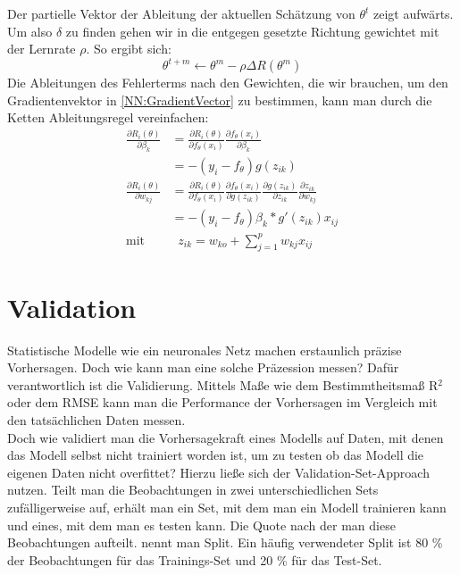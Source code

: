 \documentclass[a4paper,12pt]{thesis}
\begin{document}
Der partielle Vektor der Ableitung der aktuellen Schätzung von $\theta^t$ zeigt aufwärts. Um also $\delta$ zu finden gehen wir in die entgegen gesetzte Richtung gewichtet mit der Lernrate $\rho$. So ergibt sich:
\begin{equation}
	\label{NN:Lernfunktion}
	\theta^{t+m} \leftarrow \theta^m -\rho \Delta R(\theta^m)
\end{equation}
Die Ableitungen des Fehlerterms nach den Gewichten, die wir brauchen, um den Gradientenvektor in \ref{NN:GradientVector} zu bestimmen, kann man durch die Ketten Ableitungsregel vereinfachen:
\begin{equation}
	\label{NN:ChainRule}
	\begin{aligned}
		\frac{\partial R_i(\theta)}{\partial \beta_k}& = \frac{\partial R_i(\theta)}{\partial f_{\theta} (x_i)} \frac{\partial f_{\theta} (x_i)}{\partial \beta_k}\\
		& = -(y_i - f_{\theta})g(z_{ik})\\
		\frac{\partial R_i(\theta)}{\partial w_{kj}}& = \frac{\partial R_i(\theta)}{\partial f_{\theta} (x_i)} \frac{\partial f_{\theta} (x_i)}{\partial g(z_{ik})} \frac{\partial g(z_{ik}) }{\partial z_{ik}} \frac{\partial z_{ik}}{\partial w_{kj}}\\
		& = -(y_i - f_{\theta})\beta_k*g'(z_{ik})x_{ij}\\
		\text{mit}& \; \; z_{ik}=w_{ko}+ \sum^p_{j=1}w_{kj}x_{ij}
	\end{aligned} 
\end{equation}

\section{Validation}

Statistische Modelle wie ein neuronales Netz machen erstaunlich präzise Vorhersagen. Doch wie kann man eine solche Präzession messen? Dafür verantwortlich ist die Validierung. Mittels Maße wie dem Bestimmtheitsmaß R$^2$ oder dem RMSE kann man die Performance der Vorhersagen im Vergleich mit den tatsächlichen Daten messen.\\
Doch wie validiert man die Vorhersagekraft eines Modells auf Daten, mit denen das Modell selbst nicht trainiert worden ist, um zu testen ob das Modell die eigenen Daten nicht overfittet? Hierzu ließe sich der Validation-Set-Approach nutzen. Teilt man die Beobachtungen in zwei unterschiedlichen Sets zufälligerweise auf, erhält man ein Set, mit dem man ein Modell trainieren kann und eines, mit dem man es testen kann. Die Quote nach der man diese Beobachtungen aufteilt. nennt man Split. Ein häufig verwendeter Split ist 80 \% der Beobachtungen für das Trainings-Set und 20 \% für das Test-Set.
\end{document}
